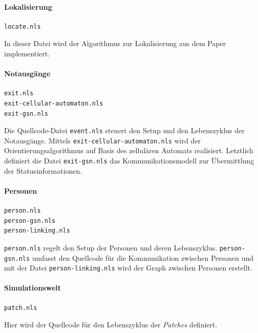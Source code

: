 \paragraph{Lokalisierung}

\begin{verbatim}
locate.nls
\end{verbatim}

In dieser Datei wird der Algorithmus zur Lokalisierung aus dem Paper \cite{Jonathan.2004} implementiert.

\paragraph{Notausgänge}

\begin{verbatim}
exit.nls
exit-cellular-automaton.nls
exit-gsn.nls
\end{verbatim}

Die Quellcode-Datei \verb|event.nls| steuert den Setup und den Lebenszyklus der Notausgänge. Mittels \verb|exit-cellular-automaton.nls| wird der Orientierungsalgorithmus auf Basis des zellulären Automats realisiert. Letztlich definiert die Datei \verb|exit-gsn.nls| das Kommunikationsmodell zur Übermittlung der Statusinformationen.

\paragraph{Personen}

\begin{verbatim}
person.nls
person-gsn.nls
person-linking.nls
\end{verbatim}

\verb|person.nls| regelt den Setup der Personen und deren Lebenszyklus. \verb|person-gsn.nls| umfasst den Quellcode für die Kommunikation zwischen Personen und mit der Datei \verb|person-linking.nls| wird der Graph zwischen Personen erstellt.

\paragraph{Simulationswelt}

\begin{verbatim}
patch.nls
\end{verbatim}

Hier wird der Quellcode für den Lebenszyklus der \emph{Patches} definiert.
